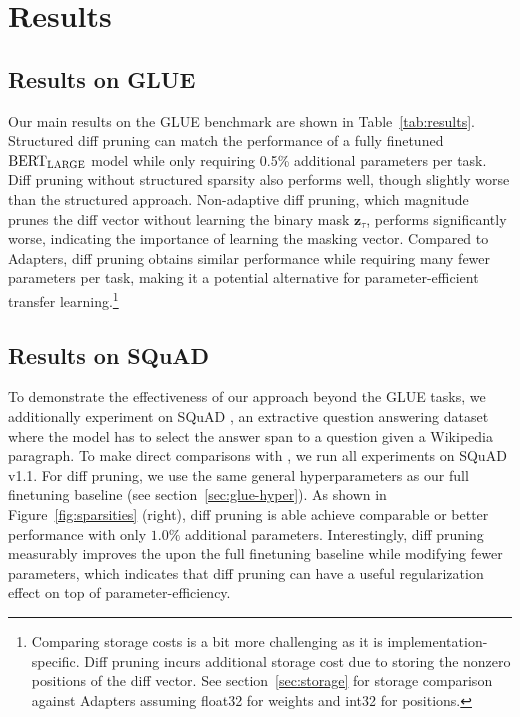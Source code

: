 \section{Results}

\subsection{Results on GLUE}

Our main results on the GLUE benchmark are shown in Table~\ref{tab:results}. Structured diff pruning can match the performance of a fully finetuned $\text{BERT}_{\textsc{LARGE}}$ model while only requiring 0.5\% additional parameters per task. Diff pruning without structured sparsity also performs well, though slightly worse than the structured approach. Non-adaptive diff pruning, which magnitude prunes the diff vector without learning the binary mask $\mathbf{z}_\tau$, performs significantly worse, indicating the importance of learning the masking vector. Compared to Adapters, diff pruning obtains similar performance  while requiring many fewer parameters per task, making it a potential alternative for parameter-efficient transfer learning.\footnote{Comparing storage costs is a bit more challenging as it is implementation-specific. Diff pruning incurs additional storage cost due to storing the nonzero positions of the diff vector. See section~\ref{sec:storage} for storage comparison against Adapters assuming float32 for weights and int32 for positions.} 

\subsection{Results on SQuAD}

To demonstrate the effectiveness of our approach beyond the GLUE tasks, we additionally experiment on SQuAD \citep{rajpurkar-etal-2016-squad}, an extractive question answering dataset where the model has to select the answer span to a question given a Wikipedia paragraph. To make direct comparisons with \citet{houlsby2019adapters}, we run all experiments on SQuAD v1.1. For diff pruning, we use the same general hyperparameters as our full finetuning baseline (see section~\ref{sec:glue-hyper}).
As shown in Figure~\ref{fig:sparsities} (right), diff pruning is able achieve comparable or better performance with only $1.0\%$ additional parameters. Interestingly, diff pruning measurably improves the upon the full finetuning baseline while modifying fewer parameters, which indicates that diff pruning can have a useful regularization effect on top of parameter-efficiency. 

